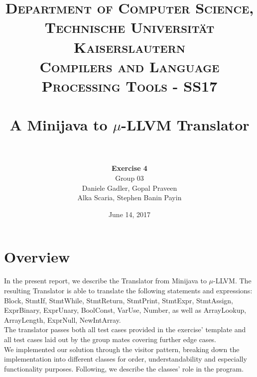 \documentclass[paper=a4, fontsize=11pt]{scrartcl}
\title{
		\usefont{OT1}{bch}{b}{n}
		\normalfont \normalsize \textsc{Department of Computer Science, Technische Universit\"at Kaiserslautern\\
Compilers and Language Processing Tools - SS17
		} \\ [2pt]
		\horrule{0.5pt} \\[0.4cm]
		\huge A Minijava to $\mu$-LLVM Translator\\
		\horrule{2pt} \\[0.5cm]
}
\author{	
		\textbf{Exercise 4}\\
		Group 03\\
        Daniele Gadler, Gopal Praveen\\Alka Scaria, Stephen Banin Payin \\[-1pt]		\normalsize
}
\date{June 14, 2017}
\numberwithin{equation}{section}		%
\numberwithin{figure}{section}			%
\numberwithin{table}{section}				%
\begin{document}
\maketitle

\section*{Overview}
In the present report, we describe the Translator from Minijava to $\mu$-LLVM. The resulting Translator is able to translate the following statements and expressions: Block, StmtIf, StmtWhile, StmtReturn, StmtPrint, StmtExpr,
StmtAssign, ExprBinary, ExprUnary, BoolConst, VarUse, Number, as well as ArrayLookup, ArrayLength, ExprNull, NewIntArray. \\
The translator passes both all test cases provided in the exercise' template and all test cases laid out by the group mates covering further edge cases. \\
We implemented our solution through the visitor pattern, breaking down the implementation into different classes for order, understandability and especially functionality purposes. Following, we describe the classes' role in the program. 
\end{document}
